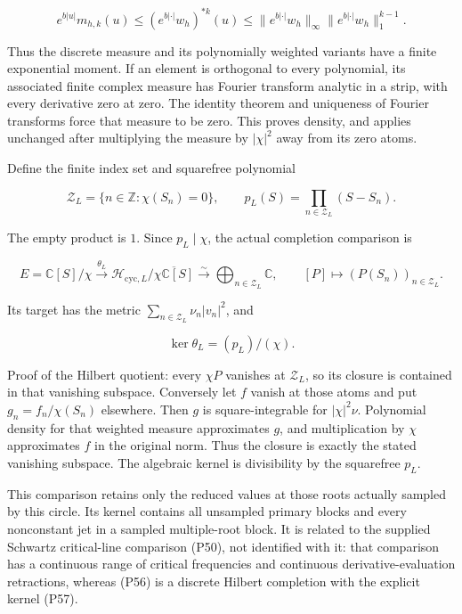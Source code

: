 \documentclass[
]{article}
\begin{document}
\[
e^{b|u|}m_{h,k}(u)
\le(e^{b|\cdot|}w_h)^{*k}(u)
\le\|e^{b|\cdot|}w_h\|_\infty
\|e^{b|\cdot|}w_h\|_1^{k-1}.
\tag{P54}
\]

Thus the discrete measure and its polynomially weighted variants have a
finite exponential moment. If an element is orthogonal to every
polynomial, its associated finite complex measure has Fourier transform
analytic in a strip, with every derivative zero at zero. The identity
theorem and uniqueness of Fourier transforms force that measure to be
zero. This proves density, and applies unchanged after multiplying the
measure by \(|\chi|^2\) away from its zero atoms.

Define the finite index set and squarefree polynomial

\[
\mathcal Z_L=\{n\in\mathbb Z:\chi(S_n)=0\},\qquad
p_L(S)=\prod_{n\in\mathcal Z_L}(S-S_n).
\tag{P55}
\]

The empty product is \(1\). Since \(p_L\mid\chi\), the actual completion
comparison is

\[
\boxed{
E=\mathbb C[S]/\chi
\xrightarrow{\theta_L}
\mathcal H_{\mathrm{cyc},L}/\overline{\chi\mathbb C[S]}
\xrightarrow{\sim}\bigoplus_{n\in\mathcal Z_L}\mathbb C,
\qquad [P]\longmapsto(P(S_n))_{n\in\mathcal Z_L}.}
\tag{P56}
\]

Its target has the metric \(\sum_{n\in\mathcal Z_L}\nu_n|v_n|^2\), and

\[
\boxed{\ker\theta_L=(p_L)/(\chi).}\tag{P57}
\]

Proof of the Hilbert quotient: every \(\chi P\) vanishes at
\(\mathcal Z_L\), so its closure is contained in that vanishing
subspace. Conversely let \(f\) vanish at those atoms and put
\(g_n=f_n/\chi(S_n)\) elsewhere. Then \(g\) is square-integrable for
\(|\chi|^2\nu\). Polynomial density for that weighted measure
approximates \(g\), and multiplication by \(\chi\) approximates \(f\) in
the original norm. Thus the closure is exactly the stated vanishing
subspace. The algebraic kernel is divisibility by the squarefree
\(p_L\).

This comparison retains only the reduced values at those roots actually
sampled by this circle. Its kernel contains all unsampled primary blocks
and every nonconstant jet in a sampled multiple-root block. It is
related to the supplied Schwartz critical-line comparison (P50), not
identified with it: that comparison has a continuous range of critical
frequencies and continuous derivative-evaluation retractions, whereas
(P56) is a discrete Hilbert completion with the explicit kernel (P57).
\end{document}
